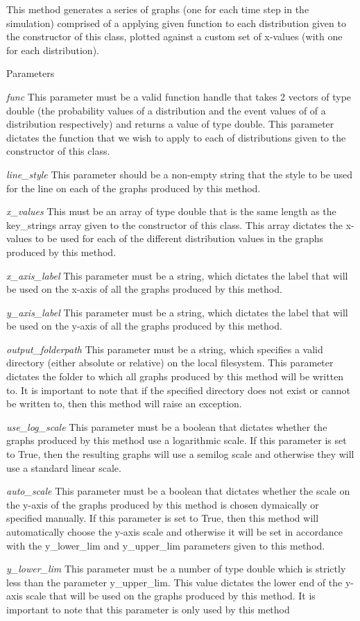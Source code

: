 This method generates a series of graphs (one for each time step in the simulation) comprised of a applying given function to each distribution given to the constructor of this class, plotted against a custom set of x-\/values (with one for each distribution). 


\begin{DoxyParams}{Parameters}
\item[{\em func}]This parameter must be a valid function handle that takes 2 vectors of type double (the probability values of a distribution and the event values of of a distribution respectively) and returns a value of type double. This parameter dictates the function that we wish to apply to each of distributions given to the constructor of this class. \item[{\em line\_\-style}]This parameter should be a non-\/empty string that the style to be used for the line on each of the graphs produced by this method. \item[{\em x\_\-values}]This must be an array of type double that is the same length as the key\_\-strings array given to the constructor of this class. This array dictates the x-\/values to be used for each of the different distribution values in the graphs produced by this method. \item[{\em x\_\-axis\_\-label}]This parameter must be a string, which dictates the label that will be used on the x-\/axis of all the graphs produced by this method. \item[{\em y\_\-axis\_\-label}]This parameter must be a string, which dictates the label that will be used on the y-\/axis of all the graphs produced by this method. \item[{\em output\_\-folderpath}]This parameter must be a string, which specifies a valid directory (either absolute or relative) on the local filesystem. This parameter dictates the folder to which all graphs produced by this method will be written to. It is important to note that if the specified directory does not exist or cannot be written to, then this method will raise an exception. \item[{\em use\_\-log\_\-scale}]This parameter must be a boolean that dictates whether the graphs produced by this method use a logarithmic scale. If this parameter is set to True, then the resulting graphs will use a semilog scale and otherwise they will use a standard linear scale. \item[{\em auto\_\-scale}]This parameter must be a boolean that dictates whether the scale on the y-\/axis of the graphs produced by this method is chosen dymaically or specified manually. If this parameter is set to True, then this method will automatically choose the y-\/axis scale and otherwise it will be set in accordance with the y\_\-lower\_\-lim and y\_\-upper\_\-lim parameters given to this method. \item[{\em y\_\-lower\_\-lim}]This parameter must be a number of type double which is strictly less than the parameter y\_\-upper\_\-lim. This value dictates the lower end of the y-\/axis scale that will be used on the graphs produced by this method. It is important to note that this parameter is only used by this method 
\end{DoxyParams}
